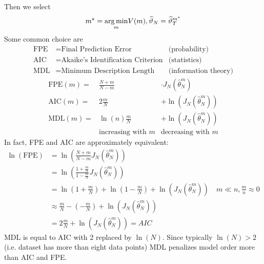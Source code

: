 Then we select
\begin{equation*}
m^{\star} =\underset{m}{\operatorname*{arg\,min}} V(m) ,\widehat{\vartheta }_{N} =\widehat{\vartheta }_{T}^{m^{\star}}
\end{equation*}
Some common choice are
\begin{align*}
\text{FPE} & =\text{Final Prediction Error} & \text{(probability)}\\
\text{AIC} & =\text{Akaike's Identification Criterion} & \text{(statistics)}\\
\text{MDL} & =\text{Minimum Description Length} & \text{(information theory)}
\end{align*}
\begin{equation*}
	\begin{array}{rcc}
		\text{FPE}(m) = & \frac{N+m}{N-m}          &  \cdot J_{N}\left(\hat{\theta }_{N}^{m}\right)\\
		\text{AIC}(m) = & 2\frac{m}{N}             &  +\ln\left(J_{N}\left(\hat{\theta }_{N}^{m}\right)\right)\\
		\text{MDL}(m) = & \ln(n)\frac{m}{N}        &  +\ln\left(J_{N}\left(\hat{\theta }_{N}^{m}\right)\right)\\
		                & \text{increasing with }m &  \text{decreasing with }m
	\end{array}
\end{equation*}
In fact, FPE and AIC are approximately equivalent:
\begin{align*}
\ln(\text{FPE}) & =\ln\left(\frac{N+m}{N-m} J_{N}\left(\hat{\theta }_{N}^{m}\right)\right) \\
 & =\ln\left(\frac{1+\frac{m}{N}}{1-\frac{m}{N}} J_{N}\left(\hat{\theta }_{N}^{m}\right)\right) \\
 & =\ln\left(1+\frac{m}{N}\right) +\ln\left(1-\frac{m}{N}\right) +\ln\left(J_{N}\left(\hat{\theta }_{N}^{m}\right)\right) \quad m\ll n, \frac{m}{n} \approx 0\\
 & \approx \frac{m}{N} -\left(-\frac{m}{N}\right) +\ln\left(J_{N}\left(\hat{\theta }_{N}^{m}\right)\right) \\
 & =2\frac{m}{N} +\ln\left(J_{N}\left(\hat{\theta }_{N}^{m}\right)\right) =AIC & 
\end{align*}
MDL is equal to AIC with 2 replaced by $ \ln(N)$. Since typically $ \ln(N)  >2$ (i.e. dataset has more than eight data points) MDL penalizes model order more than AIC and FPE.